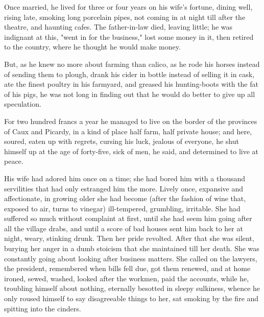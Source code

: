 \documentclass{tufte-book}
\begin{document}
Once married, he lived for three or four years on his wife's fortune,
dining well, rising late, smoking long porcelain pipes, not coming in
at night till after the theatre, and haunting cafes. The father-in-law
died, leaving little; he was indignant at this, "went in for the
business," lost some money in it, then retired to the country, where he
thought he would make money.

But, as he knew no more about farming than calico, as he rode his horses
instead of sending them to plough, drank his cider in bottle instead of
selling it in cask, ate the finest poultry in his farmyard, and greased
his hunting-boots with the fat of his pigs, he was not long in finding
out that he would do better to give up all speculation.

For two hundred francs a year he managed to live on the border of
the provinces of Caux and Picardy, in a kind of place half farm, half
private house; and here, soured, eaten up with regrets, cursing his
luck, jealous of everyone, he shut himself up at the age of forty-five,
sick of men, he said, and determined to live at peace.

His wife had adored him once on a time; she had bored him with a
thousand servilities that had only estranged him the more. Lively once,
expansive and affectionate, in growing older she had become (after the
fashion of wine that, exposed to air, turns to vinegar) ill-tempered,
grumbling, irritable. She had suffered so much without complaint at
first, until she had seem him going after all the village drabs, and
until a score of bad houses sent him back to her at night, weary,
stinking drunk. Then her pride revolted. After that she was silent,
burying her anger in a dumb stoicism that she maintained till her death.
She was constantly going about looking after business matters. She
called on the lawyers, the president, remembered when bills fell due,
got them renewed, and at home ironed, sewed, washed, looked after the
workmen, paid the accounts, while he, troubling himself about nothing,
eternally besotted in sleepy sulkiness, whence he only roused himself
to say disagreeable things to her, sat smoking by the fire and spitting
into the cinders.
\end{document}
